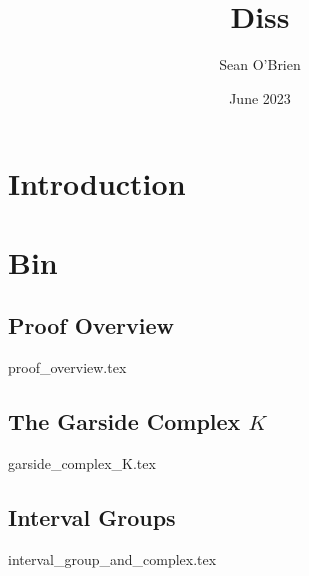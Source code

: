 \documentclass{article}
\title{Diss}
\author{Sean O'Brien}
\date{June 2023}
\begin{document}
\maketitle

\section{Introduction}

\section{Bin}
\subsection{Proof Overview}
{proof_overview.tex}

\subsection{The Garside Complex $K$}
{garside_complex_K.tex}
\subsection{Interval Groups}
{interval_group_and_complex.tex}


\printbibliography
\end{document}
